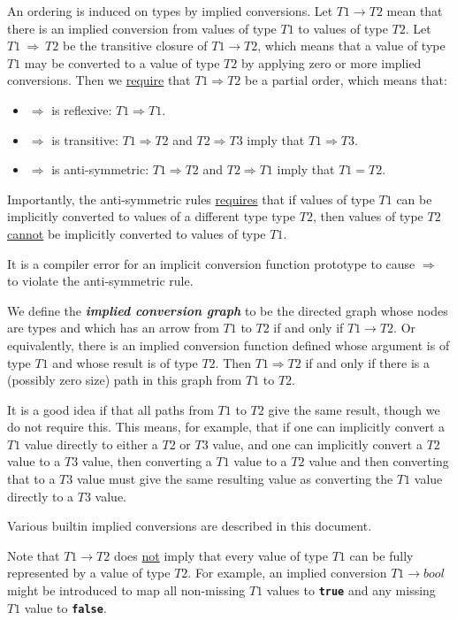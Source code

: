 \documentclass[12pt]{article}
\newcommand{\TT}[1]{{\tt \bfseries #1}}
\newcommand{\key}[1]{{\bf \em #1}\index{#1}}
\newcommand{\CNV}{\longrightarrow}	%
\newcommand{\TCNV}{\Longrightarrow}	%
\begin{document}
An ordering is induced on types by implied conversions.  Let
$T1\CNV T2$ mean that there is an implied conversion from
values of type $T1$ to values of type $T2$.  Let $T1~\TCNV~T2$
be the transitive closure of $T1\CNV T2$, which means
that a value of type $T1$ may be converted to a value
of type $T2$ by applying zero or more implied conversions.
Then we \underline{require}
that $T1\TCNV T2$ be a partial order, which means that:
\begin{itemize}
\item $\TCNV$ is reflexive: $T1\TCNV T1$.
\item $\TCNV$ is transitive: $T1\TCNV T2$ and $T2\TCNV T3$
imply that $T1\TCNV T3$.
\item $\TCNV$ is anti-symmetric:
$T1\TCNV T2$ and $T2\TCNV T1$
imply that $T1 = T2$.
\end{itemize}

Importantly, the anti-symmetric rules \underline{requires} that
if values of type $T1$ can be implicitly converted to
values of a different type type $T2$, then values of type $T2$
\underline{cannot} be implicitly converted to values of type $T1$.

It is a compiler error for an implicit conversion function
prototype to cause $\TCNV$ to violate the anti-symmetric rule.

We define the \key{implied conversion graph} to be the directed
graph whose nodes are types and which has an arrow from $T1$ to
$T2$ if and only if $T1\CNV T2$.
Or equivalently, there is an implied conversion function defined
whose argument is of type $T1$ and whose result is of type $T2$.
Then $T1\TCNV T2$ if and only if there is a (possibly zero size)
path in this graph from $T1$ to $T2$.

It is a good idea if that all paths
from $T1$ to $T2$ give the same result, though we do not require
this.
This means, for example, that
if one can implicitly convert a $T1$ value directly to
either a $T2$ or $T3$ value, and one can implicitly convert
a $T2$ value to a $T3$ value, then converting a $T1$ value
to a $T2$ value and then converting that to a $T3$ value
must give the same resulting value as converting the $T1$ value
directly to a $T3$ value.

Various builtin implied conversions are described
in this document.

Note that $T1\CNV T2$ does \underline{not} imply that every
value of type $T1$ can be fully represented by a value of type
$T2$.  For example, an implied conversion $T1\CNV bool$
might be introduced to map all non-missing $T1$ values to \TT{true}
and any missing $T1$ value to \TT{false}.
\end{document}
